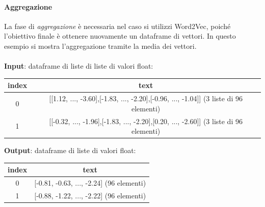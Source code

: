 \documentclass[12pt]{report}
\theoremstyle{definition}
\begin{document}
\paragraph{Aggregazione}
La fase di \textit{aggregazione} è necessaria nel caso si utilizzi Word2Vec, poiché l'obiettivo finale è ottenere nuovamente un dataframe di vettori. In questo esempio si mostra l'aggregazione tramite la media dei vettori.
\\
\\
\textbf{Input}: dataframe di liste di liste di valori float:
\begin{center}
    \begin{tabular}{|c|c|}
    \hline
    \textbf{index} & \textbf{text} \\
    \hline
         0 & [[1.12, ..., -3.60],[-1.83, ..., -2.20],[-0.96, ..., -1.04]] (3 liste di 96 elementi) \\
         1 & [[-0.32, ..., -1.96],[-1.83, ..., -2.20],[0.20, ..., -2.60]] (3 liste di 96 elementi) \\
    \hline
    \end{tabular}
\end{center}
\textbf{Output}: dataframe di liste di valori float:
\begin{center}
    \begin{tabular}{|c|c|}
    \hline
    \textbf{index} & \textbf{text} \\
    \hline
         0 & [-0.81, -0.63, ..., -2.24] (96 elementi) \\
         1 & [-0.88, -1.22, ..., -2.22] (96 elementi) \\
    \hline
    \end{tabular}
\end{center}
\end{document}
